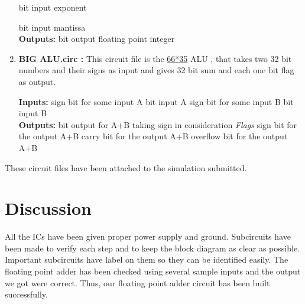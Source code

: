 \documentclass[12pt]{article}
\begin{document}
\begin{enumerate}
\begin{outline}
         bit input exponent

         bit input mantissa\\

        

        \1 \textbf{Outputs:}
         bit output floating point integer\\
    
    \end{outline}
    

     \item \textbf{BIG ALU.circ : } This circuit file is the \underline{66*35} ALU , that takes two 32 bit numbers and their signs as input and gives 32 bit sum and each one bit flag as output.

     
    \begin{outline}

    \1 \textbf{Inputs:}
     sign bit for some input A
     bit input A
     sign bit for some input B
     bit input B \\



    \1 \textbf{Outputs:}
     bit output for A+B taking sign in consideration
    \2 \textit{Flags} 
     sign bit for the output A+B
     carry bit for the output A+B
     overflow bit for the output A+B\\
  
    \end{outline}

     
\end{enumerate} 

These circuit files have been attached to the simulation submitted.

\section{Discussion}
All the ICs have been given proper power supply and ground. Subcircuits have been made to verify each step and to keep the block diagram as clear as possible. Important subcircuits have label on them so they can be identified easily. The floating point adder has been checked using several sample inputs and the output we got were correct. Thus, our floating point adder circuit has been built successfully.
\end{document}
